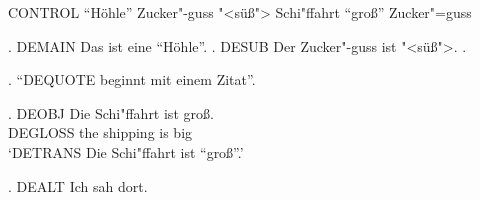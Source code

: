 
\usepackage{polyglossia}
\setdefaultlanguage[babelshorthands=true]{german}

CONTROL "`H\"ohle"' Zucker"-guss "<s\"u\ss"> Schi"ffahrt "`gro\ss"' Zucker"=guss

\ex. DEMAIN Das ist eine "`H\"ohle"'.
\a. DESUB Der Zucker"-guss ist "<s\"u\ss">.
\z.

\ex. "`DEQUOTE beginnt mit einem Zitat"'.

\exg. DEOBJ Die Schi"ffahrt ist gro\ss.\\ DEGLOSS the shipping is big\\
\glt `DETRANS Die Schi"ffahrt ist "`gro\ss"'.'

\ex. DEALT Ich sah  dort.


